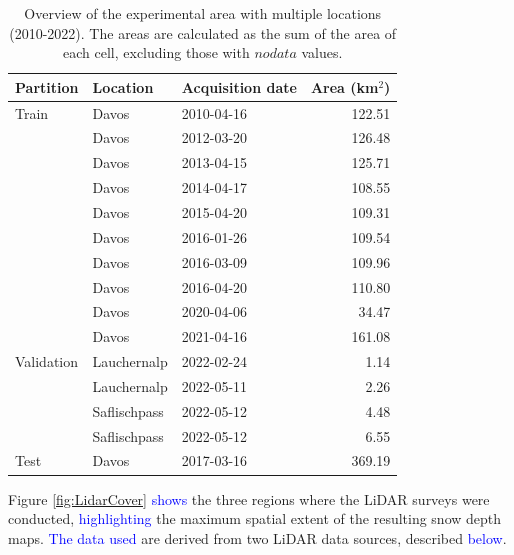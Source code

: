 \documentclass[preprint,12pt]{elsarticle}
\begin{document}
\begin{table}[htbp]
\caption{Overview of the experimental area with multiple locations (2010-2022). The areas are calculated as the sum of the area of each cell, excluding those with $nodata$ values.}
\label{table:areaoverview}
\centering
\small
\begin{tabular}{lllr}
\hline
Partition & Location & Acquisition date  & Area (km$^2$)  \\ 
\hline
Train & Davos & 2010-04-16 & 122.51  \\ 
      & Davos & 2012-03-20 & 126.48  \\ 
      & Davos & 2013-04-15 & 125.71  \\ 
      & Davos & 2014-04-17 & 108.55  \\ 
      & Davos & 2015-04-20 & 109.31  \\ 
      & Davos & 2016-01-26 & 109.54  \\ 
      & Davos & 2016-03-09 & 109.96  \\ 
      & Davos & 2016-04-20 & 110.80  \\ 
      & Davos & 2020-04-06 & 34.47   \\ 
      & Davos & 2021-04-16 & 161.08  \\ 
\hline
Validation & Lauchernalp  & 2022-02-24 & 1.14  \\ 
    & Lauchernalp  & 2022-05-11 & 2.26  \\
    & Saflischpass  & 2022-05-12 & 4.48  \\ 
    & Saflischpass  & 2022-05-12 & 6.55  \\ 
\hline
Test & Davos  & 2017-03-16 & 369.19   \\ \hline
\end{tabular}
\end{table}

Figure \ref{fig:LidarCover} \textcolor{blue}{shows} the three regions where the LiDAR surveys were conducted, \textcolor{blue}{highlighting} the maximum spatial extent of the resulting snow depth maps. \textcolor{blue}{The data used} are derived from two LiDAR data sources, described \textcolor{blue}{below}.
\end{document}
